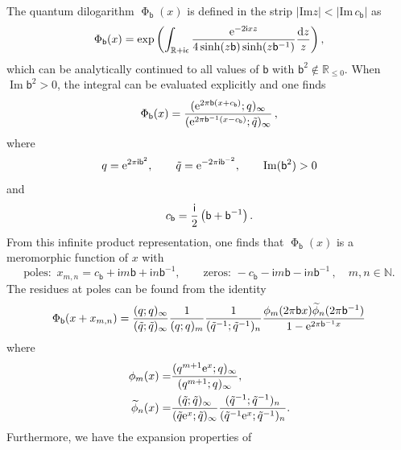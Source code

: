 \documentclass[a4paper,11pt]{article}
\theoremstyle{definition}
\def\IR{{\mathbb R}}
\def\IN{{\mathbb N}}
\newcommand{\re}{{\rm e}}
\newcommand{\im}{\mathsf{i}}
\def\tq{{\tilde{q}}}
\newcommand{\mb}{\mathsf{b}}
\newcommand{\bb}{\mathsf{b}}
\newcommand{\fad}{\operatorname{\Phi}_{\mathsf{b}}}
\newcommand{\wt}[1]{\widetilde{#1}}
\DeclareMathOperator{\imag}{Im}
\begin{document}
The quantum dilogarithm $\fad(x)$ is defined in the strip
$|\mathrm{Im} z| < |\mathrm{Im} \, c_{\mathsf{b}}|$ as
\cite{faddeev,fk}%
\begin{equation}
\fad(x)=\exp \left( \int_{\mathbb{R}+\im\epsilon}
\frac{\re^{-2\im xz}}{4\sinh(z\mathsf{b})\sinh(z\mathsf{b}^{-1})}
{\operatorname{d}\!z  \over z} \right),
\end{equation}
which can be analytically continued to all values of $\bb$ with
$\bb^2\not\in\IR_{\leq 0}$.
When $\imag \bb^2 >0$, the integral can be evaluated explicitly and
one finds
%
\begin{equation}\label{fad}
\fad(x)
=\frac{(\re^{2 \pi \mathsf{b} (x+c_{\mathsf{b}})};q)_\infty}{
(\re^{2 \pi \mathsf{b}^{-1} (x-c_{\mathsf{b}})};\tq)_\infty} \,,
\end{equation}
%
where
\begin{equation}
\label{qq}
q=\re^{2 \pi \im \mathsf{b}^2}, \qquad 
\tq=\re^{-2 \pi \im \mathsf{b}^{-2}}, \qquad 
\mathrm{Im}(\mathsf{b}^2) >0
\end{equation}
%
and 
%
\begin{equation}
\label{defcb}
c_\mb= {\im \over 2} \left(\mb+\mb^{-1}\right). 
\end{equation}
%
%
From this infinite product representation, one finds that  $\fad(x)$ is 
a meromorphic function of $x$ with
%
\begin{equation}
  \text{poles:} \,\,\, x_{m,n} = c_{\mathsf{b}} + \im m \mathsf{b} + \im n \mathsf{b}^{-1},
  \qquad
  \text{zeros:} \,\, -c_{\mathsf{b}} - \im m \mathsf{b} - \im
  n\mathsf{b}^{-1} \,,\quad m,n\in \IN.
\end{equation}
%
The residues at poles can be found from the identity \cite{GK-qseries}
\begin{equation}
  \fad(x+x_{m,n}) = \frac{(q;q)_\infty}{(\tq;\tq)_\infty}
  \frac{1}{(q;q)_m}\frac{1}{(\tq^{-1};\tq^{-1})_n}
  \frac{\phi_m(2\pi\bb x)\wt{\phi}_n(2\pi\bb^{-1})}
  {1-\re^{2\pi\bb^{-1}x}}
  \label{eq:fad-res}
\end{equation}
where
\begin{equation}
  \begin{aligned}
    \phi_m(x) =
    &\frac{(q^{m+1}\re^x;q)_\infty}{(q^{m+1};q)_\infty},\\
    \wt{\phi}_n(x) =
    &\frac{(\tq;\tq)_\infty}{(\tq \re^x;\tq)_\infty}
    \frac{(\tq^{-1};\tq^{-1})_n}{(\tq^{-1}\re^x;\tq^{-1})_n}.
  \end{aligned}
\end{equation}
Furthermore, we have the expansion properties of
\end{document}
